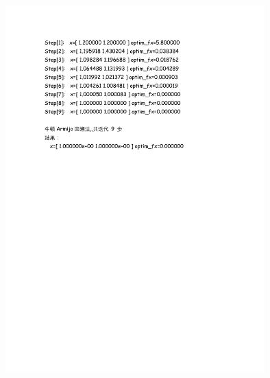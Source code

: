 \documentclass[UTF8]{ctexart}
\begin{document}
\begin{enumerate}
\begin{figure}[H]
\centering
\includegraphics[width=10cm]{fig/3_5.pdf}
\end{figure}


\end{enumerate}
\end{document}
